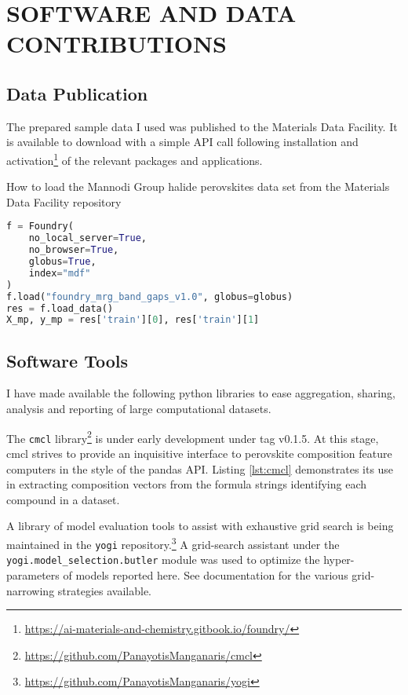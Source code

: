\chapter{SOFTWARE AND DATA CONTRIBUTIONS}
\label{sec:orgc7f868a}
\section*{Data Publication}
\label{sec:org3731a35}
The prepared sample data I used was published to the Materials Data Facility.
It is available to download with a simple API call following installation and activation\footnote{\url{https://ai-materials-and-chemistry.gitbook.io/foundry/}} of the relevant packages and applications.

\begin{ZZlisting}[tbph]
  \caption{\label{lst:MDF} How to load the Mannodi Group halide perovskites data set from the Materials Data Facility repository}
  \begin{CenteredBox}
    \begin{lstlisting}[language=python]
f = Foundry(
    no_local_server=True,
    no_browser=True,
    globus=True,
    index="mdf"
)
f.load("foundry_mrg_band_gaps_v1.0", globus=globus)
res = f.load_data()
X_mp, y_mp = res['train'][0], res['train'][1]
    \end{lstlisting}
  \end{CenteredBox}
\end{ZZlisting}

\section*{Software Tools}
\label{sec:org660d957}
I have made available the following python libraries to ease aggregation, sharing, analysis and reporting of large computational datasets.

The \texttt{cmcl} library\footnote{\url{https://github.com/PanayotisManganaris/cmcl}} is under early development under tag v0.1.5.
At this stage, cmcl strives to provide an inquisitive interface to perovskite composition feature computers in the style of the pandas API.
Listing \ref{lst:cmcl} demonstrates its use in extracting composition vectors from the formula strings identifying each compound in a dataset.

A library of model evaluation tools to assist with exhaustive grid search is being maintained in the \texttt{yogi} repository.\footnote{\url{https://github.com/PanayotisManganaris/yogi}}
A grid-search assistant under the \texttt{yogi.model\_selection.butler} module was used to optimize the hyper-parameters of models reported here.
See documentation for the various grid-narrowing strategies available.

